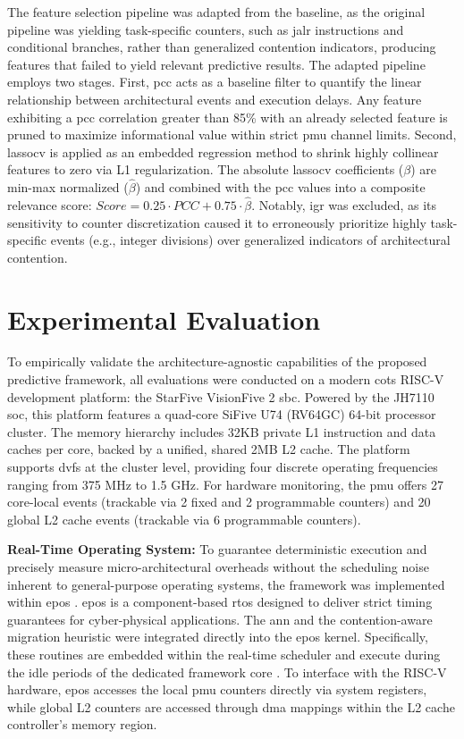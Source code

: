\documentclass[journal]{IEEEtran}
\begin{document}
The feature selection pipeline was adapted from the baseline, as the original pipeline was yielding task-specific counters, such as \gls{jalr} instructions and conditional branches, rather than generalized contention indicators, producing features that failed to yield relevant predictive results. The adapted pipeline employs two stages. First, \gls{pcc} acts as a baseline filter to quantify the linear relationship between architectural events and execution delays. Any feature exhibiting a \gls{pcc} correlation greater than 85\% with an already selected feature is pruned to maximize informational value within strict \gls{pmu} channel limits. Second, \gls{lassocv} is applied as an embedded regression method to shrink highly collinear features to zero via L1 regularization. The absolute \gls{lassocv} coefficients ($\beta$) are min-max normalized ($\widehat{\beta}$) and combined with the \gls{pcc} values into a composite relevance score: $Score = 0.25 \cdot PCC + 0.75 \cdot \widehat{\beta}$. Notably, \gls{igr} was excluded, as its sensitivity to counter discretization caused it to erroneously prioritize highly task-specific events (e.g., integer divisions) over generalized indicators of architectural contention.

\section{Experimental Evaluation}

To empirically validate the architecture-agnostic capabilities of the proposed predictive framework, all evaluations were conducted on a modern \gls{cots} RISC-V development platform: the StarFive VisionFive 2 \gls{sbc}. Powered by the JH7110 \gls{soc}, this platform features a quad-core SiFive U74 (RV64GC) 64-bit processor cluster. The memory hierarchy includes 32KB private L1 instruction and data caches per core, backed by a unified, shared 2MB L2 cache. The platform supports \gls{dvfs} at the cluster level, providing four discrete operating frequencies ranging from 375 MHz to 1.5 GHz. For hardware monitoring, the \gls{pmu} offers 27 core-local events (trackable via 2 fixed and 2 programmable counters) and 20 global L2 cache events (trackable via 6 programmable counters).

\textbf{Real-Time Operating System:} To guarantee deterministic execution and precisely measure micro-architectural overheads without the scheduling noise inherent to general-purpose operating systems, the framework was implemented within \gls{epos} \cite{epos}. \gls{epos} is a component-based \gls{rtos} designed to deliver strict timing guarantees for cyber-physical applications. The \gls{ann} and the contention-aware migration heuristic were integrated directly into the \gls{epos} kernel. Specifically, these routines are embedded within the real-time scheduler and execute during the idle periods of the dedicated framework core \cite{horstmann2019framework}. To interface with the RISC-V hardware, \gls{epos} accesses the local \gls{pmu} counters directly via system registers, while global L2 counters are accessed through \gls{dma} mappings within the L2 cache controller's memory region.
\end{document}
